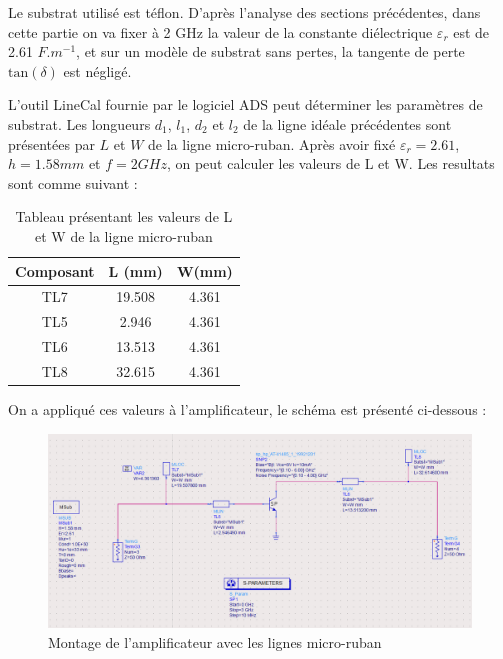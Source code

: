 \documentclass[french]{article}
\begin{document}
Le substrat utilisé est téflon. D'après l'analyse des sections précédentes, dans cette partie on va fixer à 2 GHz la valeur de la constante diélectrique $\varepsilon_{r}$ est de 2.61 $F.m^{-1}$, et sur un modèle de substrat sans pertes, la tangente de perte $\mbox{tan}(\delta)$ est négligé.

L’outil LineCal fournie par le logiciel ADS peut déterminer les paramètres de substrat. Les longueurs $d_{1}$, $l_{1}$, $d_{2}$ et $l_{2}$ de la ligne idéale précédentes sont présentées par $L$ et $W$ de la ligne micro-ruban. Après avoir fixé $\varepsilon_{r}=2.61$, $h=1.58 mm$ et $f=2 GHz$, on peut calculer les valeurs de L et W. Les resultats sont comme suivant :

\begin{table}[H]
	\centering
	\begin{tabular}{|c|c|c|}
		\hline
		Composant & L (mm) & W(mm) \\
		\hline
		TL7 & 19.508 & 4.361 \\
		\hline
		TL5 & 2.946 & 4.361 \\
		\hline
		TL6 & 13.513 & 4.361 \\
		\hline
		TL8 & 32.615 & 4.361\\
		\hline
	\end{tabular}
	\caption{Tableau présentant les valeurs de L et W de la ligne micro-ruban}
\end{table}

On a appliqué ces valeurs à l'amplificateur, le schéma est présenté ci-dessous :
\begin{figure}[H]
	\centering
	\includegraphics[width=1.0\linewidth]{../5SynthAmp/ligne_micro_ruban}
	\caption{Montage de l’amplificateur avec les lignes micro-ruban}
	\label{fig:ligne_micro_ruban}
\end{figure}
\end{document}
